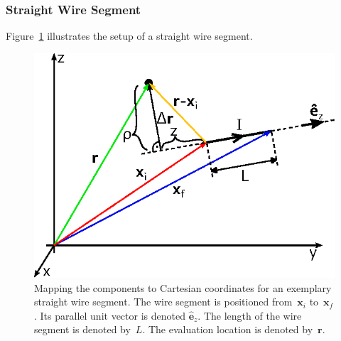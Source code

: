 \subsubsection{Straight Wire Segment}
Figure~\ref{fig:StraightWireSegment_MappingToCartesian} illustrates the setup of a straight wire segment.
\begin{figure}[htbp]
 \centering
 \includegraphics{img/StraightWireSegment_MappingToCartesian.eps}
 \caption{Mapping the components to Cartesian coordinates for an exemplary straight wire segment.
          The wire segment is positioned from~$\mathbf{x}_i$ to~$\mathbf{x}_f$.
          Its parallel unit vector is denoted $\hat{\mathbf{e}}_z$.
          The length of the wire segment is denoted by~$L$.
          The evaluation location is denoted by~$\mathbf{r}$.}
 \label{fig:StraightWireSegment_MappingToCartesian}
\end{figure}

